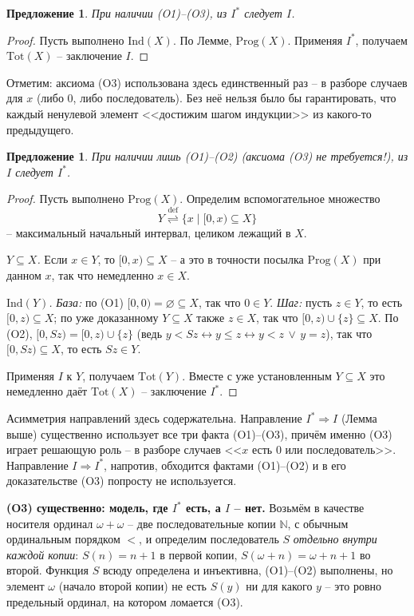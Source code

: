 \documentclass[12pt,a4paper]{article}
\theoremstyle{plain}
\newtheorem{proposition}[theorem]{Предложение}
\theoremstyle{definition}
\newcommand{\eqdef}{\mathrel{\overset{\mathrm{def}}{\rightleftharpoons}}}
\begin{document}
\begin{proposition}
При наличии (O1)--(O3), из $I^*$ следует $I$.
\end{proposition}
\begin{proof}
Пусть выполнено $\mathrm{Ind}(X)$. По Лемме, $\mathrm{Prog}(X)$. Применяя $I^*$, получаем $\mathrm{Tot}(X)$ -- заключение $I$.
\end{proof}
Отметим: аксиома (O3) использована здесь единственный раз -- в разборе случаев для $x$ (либо $0$, либо последователь). Без неё нельзя было бы гарантировать, что каждый ненулевой элемент <<достижим шагом индукции>> из какого-то предыдущего.

\begin{proposition}
При наличии лишь (O1)--(O2) (аксиома (O3) не требуется!), из $I$ следует $I^*$.
\end{proposition}
\begin{proof}
Пусть выполнено $\mathrm{Prog}(X)$. Определим вспомогательное множество
$$Y \eqdef \{x \mid [0,x)\subseteq X\}$$
-- максимальный начальный интервал, целиком лежащий в $X$.

\emph{$Y\subseteq X$.} Если $x\in Y$, то $[0,x)\subseteq X$ -- а это в точности посылка $\mathrm{Prog}(X)$ при данном $x$, так что немедленно $x\in X$.

\emph{$\mathrm{Ind}(Y)$.} \textit{База:} по (O1) $[0,0)=\varnothing\subseteq X$, так что $0\in Y$. \textit{Шаг:} пусть $z\in Y$, то есть $[0,z)\subseteq X$; по уже доказанному $Y\subseteq X$ также $z\in X$, так что $[0,z)\cup\{z\}\subseteq X$. По (O2), $[0,Sz)=[0,z)\cup\{z\}$ (ведь $y<Sz \leftrightarrow y\leqslant z \leftrightarrow y<z\,\lor\,y=z$), так что $[0,Sz)\subseteq X$, то есть $Sz\in Y$.

Применяя $I$ к $Y$, получаем $\mathrm{Tot}(Y)$. Вместе с уже установленным $Y\subseteq X$ это немедленно даёт $\mathrm{Tot}(X)$ -- заключение $I^*$.
\end{proof}

Асимметрия направлений здесь содержательна. Направление $I^*\Rightarrow I$ (Лемма выше) существенно использует все три факта (O1)--(O3), причём именно (O3) играет решающую роль -- в разборе случаев <<$x$ есть $0$ или последователь>>. Направление $I\Rightarrow I^*$, напротив, обходится фактами (O1)--(O2) и в его доказательстве (O3) попросту не используется.

\textbf{(O3) существенно: модель, где $I^*$ есть, а $I$ -- нет.} Возьмём в качестве носителя ординал $\omega+\omega$ -- две последовательные копии $\mathbb N$, с обычным ординальным порядком $<$, и определим последователь $S$ \emph{отдельно внутри каждой копии}: $S(n)=n+1$ в первой копии, $S(\omega+n)=\omega+n+1$ во второй. Функция $S$ всюду определена и инъективна, (O1)--(O2) выполнены, но элемент $\omega$ (начало второй копии) не есть $S(y)$ ни для какого $y$ -- это ровно предельный ординал, на котором ломается (O3).
\end{document}

